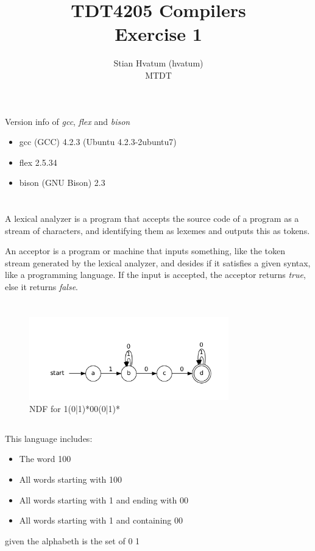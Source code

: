 \documentclass{article}
\title{TDT4205 Compilers\\
\Huge Exercise 1}
\author{Stian Hvatum (hvatum)\\MTDT}
\begin{document}
\maketitle

\section{}
Version info of \emph{gcc}, \emph{flex} and \emph{bison}
\begin{itemize}
  \item gcc (GCC) 4.2.3 (Ubuntu 4.2.3-2ubuntu7)
  \item flex 2.5.34
  \item bison (GNU Bison) 2.3
\end{itemize}


\section{}
A lexical analyzer is a program that accepts the source code of a program as a
stream of characters, and identifying them as lexemes and outputs this as
tokens.

An acceptor is a program or machine that inputs something, like the
token stream generated by the lexical analyzer, and desides if it satisfies a
given syntax, like a programming language. If the input is accepted, the
acceptor returns \emph{true}, else it returns \emph{false}.
\newpage
\section{}
\subsection{}
\begin{figure}[h]
\includegraphics[width=327px]{NDFA31.pdf}
\caption{NDF for 1(0|1)*00(0|1)*}
\end{figure}

\subsection{}
This language includes:
\begin{itemize}
  \item The word 100
  \item All words starting with 100
  \item All words starting with 1 and ending with 00
  \item All words starting with 1 and containing 00
\end{itemize}
given the alphabeth is the set of {0 1}
\end{document}
